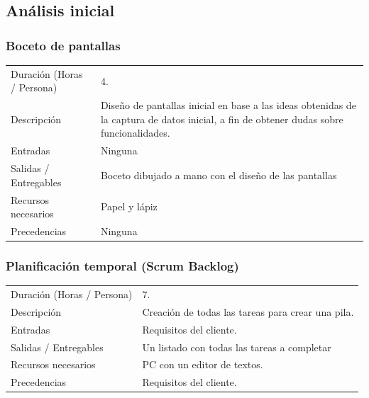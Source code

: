 \subsection{An\'alisis inicial}

\subsubsection{Boceto de pantallas}
\begin{table}[H]
    \begin{center}
        \begin{tabular}{l p{8cm}}
            Duraci\'{o}n (Horas / Persona)        & 4. \\ 
            Descripci\'{o}n                       & Diseño de pantallas inicial en base a las ideas obtenidas de la
                                                    captura de datos inicial, a fin de obtener dudas sobre funcionalidades. \\
            Entradas                              & Ninguna \\
            Salidas / Entregables                 & Boceto dibujado a mano con el dise\~{n}o de las pantallas \\
            Recursos necesarios                   & Papel y l\'{a}piz \\
            Precedencias                          & Ninguna \\
        \end{tabular}
    \end{center}
            
\end{table}

\subsubsection{Planificaci\'{o}n temporal (Scrum Backlog)}
\begin{table}[H]
    \begin{center}
        \begin{tabular}{l p{8cm}}
            Duraci\'{o}n (Horas / Persona)        & 7. \\ 
            Descripci\'{o}n                       & Creaci\'on de todas las tareas para crear una pila. \\
            Entradas                              & Requisitos del cliente.\\
            Salidas / Entregables                 & Un listado con todas las tareas a completar \\
            Recursos necesarios                   & PC con un editor de textos.\\
            Precedencias                          & Requisitos del cliente. \\
        \end{tabular}
    \end{center}
    
\end{table}



